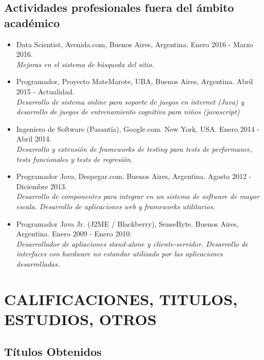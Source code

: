 \documentclass[a4paper,10pt]{article}
\begin{document}
\subsection{Actividades profesionales fuera del ámbito académico}

\begin{itemize}
    \item {Data Scientist, Avenida.com, Buenos Aires, Argentina.
            Enero 2016 - Marzo 2016. \\
            {\small \itshape Mejoras en el sistema de búsqueda del sitio.}}

    \item {Programador, Proyecto MateMarote, UBA, Buenos Aires, Argentina.
            Abril 2015 - Actualidad. \\
            {\small \itshape Desarrollo de sistema online para soporte de
        juegos en internet (Java) y desarrollo de juegos de entrenamiento
cognitivo para niños (javascript)}}

    \item {Ingeniero de Software (Pasantía), Google.com. New York, USA. Enero
            2014 - Abril 2014. \\ 
    {\small \itshape Desarrollo y extensión de frameworks de testing para tests
de performance, tests funcionales y tests de regresión.}}

    \item {Programador Java, Despegar.com. Buenos Aires, Argentina. Agosto 2012
           - Diciembre 2013. \\
    {\small \itshape Desarrollo de componentes para integrar en un sistema de
software de mayor escala. Desarrollo de aplicaciones web y frameworks
utilitarios.}}

    \item {Programador Java Jr. (J2ME / Blackberry), SenseByte. Buenos Aires,
            Argentina. Enero 2009 - Enero 2010. \\ 
    {\small \itshape Desarrollador de apliaciones stand-alone y
cliente-servidor.  Desarrollo de interfaces con hardware no estandar utilizado
por las aplicaciones desarrolladas.}}

\end{itemize}

\section{CALIFICACIONES, TITULOS, ESTUDIOS, OTROS}

\subsection{Títulos Obtenidos}
\end{document}
